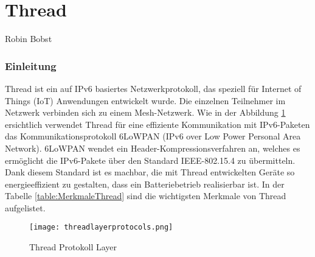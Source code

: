 \vspace*{4cm}
\part{Thread}
Robin Bobst
\vspace*{\fill}
\clearpage

\section{Einleitung}\label{sec:EinleitungThread}
Thread ist ein auf IPv6 basiertes Netzwerkprotokoll, das speziell für Internet of Things (IoT) Anwendungen entwickelt wurde. Die einzelnen Teilnehmer im Netzwerk verbinden sich zu einem Mesh-Netzwerk. Wie in der Abbildung \ref{fig:ThreadProtokollLayer} ersichtlich verwendet Thread für eine effiziente Kommunikation mit IPv6-Paketen das Kommunikationsprotokoll 6LoWPAN (IPv6 over Low Power Personal Area Network). 6LoWPAN wendet ein Header-Kompressionsverfahren an, welches es ermöglicht die IPv6-Pakete über den Standard IEEE-802.15.4 zu übermitteln. Dank diesem Standard ist es machbar, die mit Thread entwickelten Geräte so energieeffizient zu gestalten, dass ein Batteriebetrieb realisierbar ist. In der Tabelle \ref{table:MerkmaleThread} sind die wichtigsten Merkmale von Thread aufgelistet. \\

\begin{figure}[H]
	\centering
	\texttt{[image: threadlayerprotocols.png]}
	\caption{Thread Protokoll Layer \cite{erickson_picture_2019}}
	\label{fig:ThreadProtokollLayer}
\end{figure}

